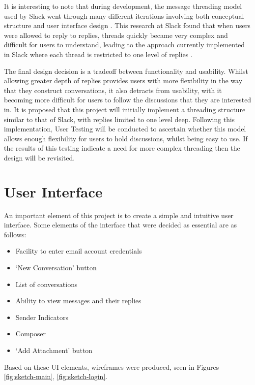 It is interesting to note that during development, the message threading model used by Slack went through many different iterations involving both conceptual structure and user interface design \cite{florin2018}. This research at Slack found that when users were allowed to reply to replies, threads quickly became very complex and difficult for users to understand, leading to the approach currently implemented in Slack where each thread is restricted to one level of replies \cite{florin2018}.

The final design decision is a tradeoff between functionality and usability. Whilst allowing greater depth of replies provides users with more flexibility in the way that they construct conversations, it also detracts from usability, with it becoming more difficult for users to follow the discussions that they are interested in. It is proposed that this project will initially implement a threading structure similar to that of Slack, with replies limited to one level deep. Following this implementation, User Testing will be conducted to ascertain whether this model allows enough flexibility for users to hold discussions, whilst being easy to use. If the results of this testing indicate a need for more complex threading then the design will be revisited.

\section{User Interface}

An important element of this project is to create a simple and intuitive user interface. Some elements of the interface that were decided as essential are as follows:
\begin{itemize}
  \item Facility to enter email account credentials
  \item `New Conversation' button
  \item List of conversations
  \item Ability to view messages and their replies
  \item Sender Indicators
  \item Composer
  \item `Add Attachment' button
\end{itemize}

Based on these UI elements, wireframes were produced, seen in Figures \ref{fig:sketch-main}, \ref{fig:sketch-login}.

